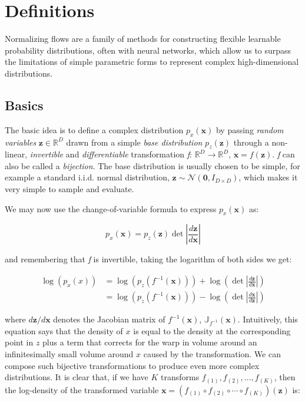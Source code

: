 \section{Definitions}

Normalizing flows are a family of methods for constructing flexible learnable probability distributions, often with neural networks, which allow us to surpass the limitations of simple parametric forms to represent complex high-dimensional distributions.

\subsection{Basics}

The basic idea is to define a complex distribution $p_x(\mathbf{x})$ by passing \emph{random variables} $\mathbf{z} \in \mathbb{R}^D$ drawn from a simple \emph{base distribution} $p_z(\mathbf{z})$ through a non-linear, \emph{invertible} and \emph{differentiable} transformation \emph{f}: $\mathbb{R}^D \rightarrow \mathbb{R}^D$, $\mathbf{x} = f(\mathbf{z})$. \emph{f} can also be called a \emph{bijection}. The base distribution is usually chosen to be simple, for example a standard i.i.d. normal distribution, $\mathbf{z}\sim\mathcal{N}(\mathbf{0},I_{D\times D})$, which makes it very simple to sample and evaluate. 

We may now use the change-of-variable formula to express $p_x(\mathbf{x})$ as:

\[
p_x(\mathbf{x}) = p_z(\mathbf{z})\det\left|\frac{d\mathbf{z}}{d\mathbf{x}}\right|
\]

and remembering that \emph{f} is invertible, taking the logarithm of both sides we get:

\begin{equation}\label{eqn:logpdf}
	\begin{aligned}
		\log(p_x(x)) &= \log(p_z(f^{-1}(\mathbf{x})))+\log\left(\det\left|\frac{d\mathbf{z}}{d\mathbf{x}}\right|\right)\\
		&= \log(p_z(f^{-1}(\mathbf{x})))-\log\left(\det\left|\frac{d\mathbf{x}}{d\mathbf{z}}\right|\right)
	\end{aligned}
\end{equation}

where $d\mathbf{z}/d\mathbf{x}$ denotes the Jacobian matrix of $f^{-1}(\mathbf{x})$, $\mathbb{J}_{f^{-1}}(\mathbf{x})$.
Intuitively, this equation says that the density of $x$ is equal to the density at the corresponding point in $z$ plus a term that corrects for the warp in volume around an infinitesimally small volume around $x$ caused by the transformation.
	We can compose such bijective transformations to produce even more complex distributions. It is clear that, if we have $K$ transforms $f_{(1)}, f_{(2)},\ldots,f_{(K)}$, then the log-density of the transformed variable $\mathbf{x}=(f_{(1)}\circ f_{(2)}\circ\cdots\circ f_{(K)})(\mathbf{z})$ is:
	
